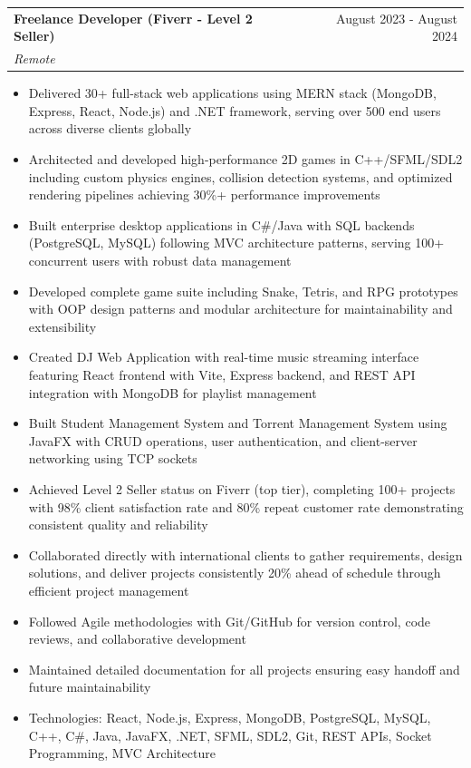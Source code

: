 \documentclass[a4paper,12pt]{article}
\makeatletter
\newenvironment{jobdetailed}[3]
    {
    \begin{tabularx}{\linewidth}{@{}l X r@{}}
    \textbf{#1} & \hfill & #2 \\
    \textit{#3} & & \\[3.75pt]
    \end{tabularx}
    \begin{minipage}[t]{\linewidth}
    \begin{itemize}[nosep,after=\strut, leftmargin=1em, itemsep=2pt,label=--]
    }
    {
    \end{itemize}
    \end{minipage}
    \vspace{6pt}
    }
\makeatother
\begin{document}
\begin{jobdetailed}{Freelance Developer (Fiverr - Level 2 Seller)}{August 2023 - August 2024}{Remote}
\item Delivered 30+ full-stack web applications using MERN stack (MongoDB, Express, React, Node.js) and .NET framework, serving over 500 end users across diverse clients globally
\item Architected and developed high-performance 2D games in C++/SFML/SDL2 including custom physics engines, collision detection systems, and optimized rendering pipelines achieving 30\%+ performance improvements
\item Built enterprise desktop applications in C\#/Java with SQL backends (PostgreSQL, MySQL) following MVC architecture patterns, serving 100+ concurrent users with robust data management
\item Developed complete game suite including Snake, Tetris, and RPG prototypes with OOP design patterns and modular architecture for maintainability and extensibility
\item Created DJ Web Application with real-time music streaming interface featuring React frontend with Vite, Express backend, and REST API integration with MongoDB for playlist management
\item Built Student Management System and Torrent Management System using JavaFX with CRUD operations, user authentication, and client-server networking using TCP sockets
\item Achieved Level 2 Seller status on Fiverr (top tier), completing 100+ projects with 98\% client satisfaction rate and 80\% repeat customer rate demonstrating consistent quality and reliability
\item Collaborated directly with international clients to gather requirements, design solutions, and deliver projects consistently 20\% ahead of schedule through efficient project management
\item Followed Agile methodologies with Git/GitHub for version control, code reviews, and collaborative development
\item Maintained detailed documentation for all projects ensuring easy handoff and future maintainability
\item Technologies: React, Node.js, Express, MongoDB, PostgreSQL, MySQL, C++, C\#, Java, JavaFX, .NET, SFML, SDL2, Git, REST APIs, Socket Programming, MVC Architecture
\end{jobdetailed}
\end{document}
